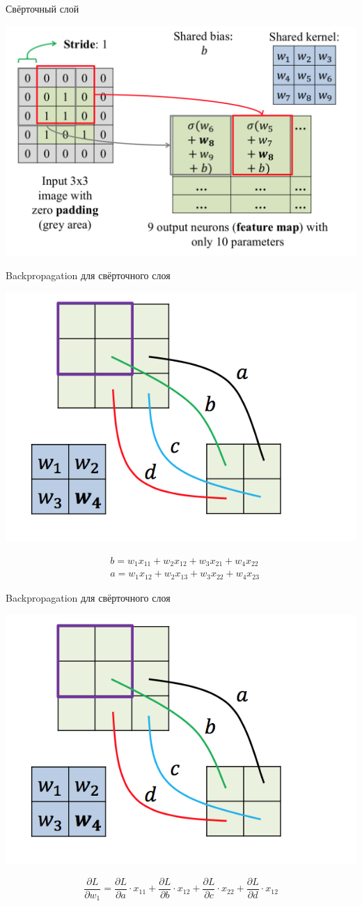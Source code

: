 \documentclass[notes,12pt, aspectratio=169]{beamer}
\begin{document}
\begin{frame}{Свёрточный слой}
\begin{center}
	\includegraphics[width=.7\linewidth]{conv_layer_2.png}
\end{center}
\end{frame}


\begin{frame}{Backpropagation для свёрточного слоя}
\begin{center}
 \includegraphics[width=.4\linewidth]{back_cl1.png}
\end{center}


\begin{equation*}
\begin{aligned}
& b = w_1 x_{11} + w_2 x_{12} + w_3 x_{21} + w_4 x_{22} \\
& a = w_1 x_{12} + w_2 x_{13} + w_3 x_{22} + w_4 x_{23} 
\end{aligned}
\end{equation*}
\end{frame}


\begin{frame}{Backpropagation для свёрточного слоя}
\begin{center}
	\includegraphics[width=.4\linewidth]{back_cl1.png}
\end{center}

\[
\frac{\partial L}{\partial w_1} = \frac{ \partial L }{\partial a} \cdot x_{11} + \frac{ \partial L }{\partial b} \cdot x_{12} + \frac{ \partial L }{\partial c} \cdot x_{22}  + \frac{ \partial L }{\partial d} \cdot x_{12} 
\]
\end{frame}
\end{document}
